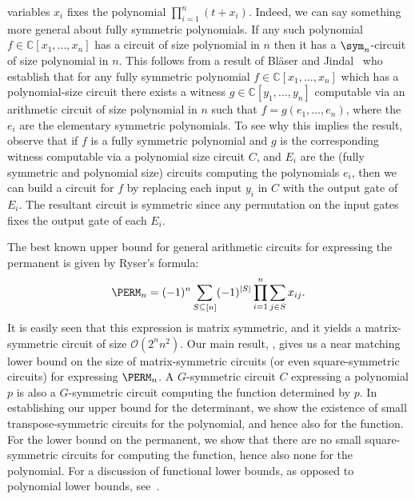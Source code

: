 \documentclass{toc}
\begin{document}
variables $x_i$ fixes the polynomial $\prod_{i=1}^n (t+x_i)$.
Indeed, we can say something more general about fully symmetric
polynomials.  If any such polynomial $f\in \mathbb{C}[x_1,...,x_n]$ has a circuit of
size polynomial in $n$ then it has a $\sym_n$-circuit of size polynomial in $n$. 
This follows from a result of Bl\"{a}ser and
Jindal~\cite{BlaeserJ19} who establish that for any fully symmetric
polynomial $f \in \mathbb{C}[x_1, \ldots, x_n]$ which has a
polynomial-size circuit there exists a witness
$g\in \mathbb{C}[y_1, \ldots, y_n]$ computable via an arithmetic
circuit of size polynomial in $n$ such that $f = g(e_1, \ldots, e_n)$,
where the %
%
%
$e_i$  %
are the elementary symmetric polynomials.   To see
why this implies the result, observe that if $f$ is a fully symmetric
polynomial and $g$ is the corresponding witness computable via a
polynomial size circuit $C$, and $E_i$ are the (fully symmetric and
polynomial size) circuits computing the polynomials $e_i$, then we can
build a circuit for $f$ by replacing each input $y_i$ in $C$ with the
output gate of $E_i$. The resultant circuit is symmetric since any
permutation on the input gates fixes the output gate of each $E_i$. 
 
The best known upper bound for general arithmetic circuits for expressing the
permanent is given by Ryser's formula:
$$\PERM_n  = (-1)^n \sum_{S \subseteq [n]} (-1)^{|S|} \prod_{i=1}^n
\sum_{j\in S} x_{ij}.$$ It is easily seen that this expression is matrix symmetric, and
it yields a matrix-symmetric circuit of size $\mathcal{O}(2^{n}n^2)$.  Our main result,
, gives us a near matching lower bound on the size of matrix-symmetric circuits (or even square-symmetric circuits) for expressing $\PERM_n$.
A $G$-symmetric circuit $C$ expressing a polynomial $p$ is also a
$G$-symmetric circuit computing the function determined by $p$. In establishing our
upper bound for the determinant, we show the existence of small transpose-symmetric
circuits for the polynomial, and hence also for the function. For the lower
bound on the permanent, we show that there are no small square-symmetric circuits for
computing the function, hence also none for the polynomial. For a discussion of
functional lower bounds, as opposed to polynomial lower bounds,
see~\cite{ForbesKS16}.
%
\end{document}
